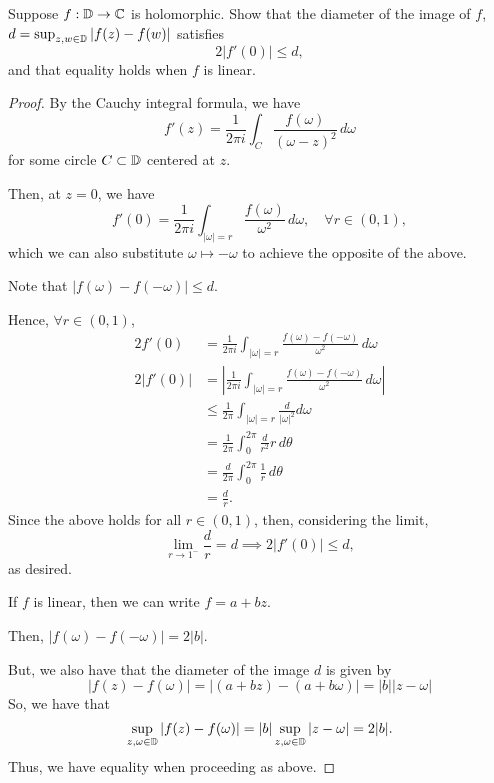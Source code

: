 \documentclass[../hw2]{subfiles}
\begin{document}
\begin{problem}
Suppose $f:\mathbb{D}\to \mathbb{C}$ is holomorphic.
Show that the diameter of the image of $f$,  $d=\sup_{z,w\in \mathbb{D}}|f(z)-f(w)|$ satisfies \[
	2|f'(0)|\le d
	,\] and that equality holds when $f$ is linear.
\end{problem}
\begin{proof}
By the Cauchy integral formula, we have \[
f'(z)=\frac{1}{2\pi i}\int_{C} \frac{f(\omega)}{(\omega-z)^2}\,d\omega
\] for some circle $C\subset \mathbb{D}$ centered at $z$.

Then, at $z=0$, we have  \[
f'(0)=\frac{1}{2\pi i}\int_{|\omega| = r} \frac{f(\omega)}{\omega^2}\,d\omega, \quad \forall r\in (0,1)
,\] which we can also substitute $\omega\mapsto -\omega$ to achieve the opposite of the above. 

Note that $|f(\omega)-f(-\omega)|\le d$.

Hence, $\forall r \in (0,1)$,
\begin{align*}
  2f'(0)&=\frac{1}{2\pi i}\int_{|\omega| = r} \frac{f(\omega)-f(-\omega)}{\omega^2} \,d\omega\\
  2|f'(0)|&=\left|  \frac{1}{2\pi i}\int_{|\omega| = r} \frac{f(\omega)-f(-\omega)}{\omega^2} \,d\omega\right| \\
          &\le \frac{1}{2\pi} \int_{|\omega| = r} \frac{d}{|\omega|^2} d\omega \\
          &= \frac{1}{2\pi} \int_{0}^{2\pi} \frac{d}{r^2} r\,d\theta\\
          &= \frac{d}{2\pi} \int_{0}^{2\pi} \frac{1}{r} \,d\theta\\
          &= \frac{d}{r}
.\end{align*}
Since the above holds for all $r \in (0,1)$, then, considering the limit, \[
\lim_{r \to 1^-} \frac{d}{r} = d \implies 2|f'(0)| \le d 
,\] as desired.

If $f$ is linear, then we can write  $f= a + bz$. 

Then,  $|f(\omega)-f(-\omega)| = 2|b|$. 

But, we also have that the diameter of the image $d$ is given by  \[
|f(z)-f(\omega)| = |(a+bz)-(a+b\omega)| = |b| |z-\omega|
\]  
So, we have that  \[
\sup_{z,\omega\in \mathbb{D}}|f(z)-f(\omega)| = |b| \sup_{z,\omega\in \mathbb{D}}|z-\omega| = 2|b|
.\] 
Thus, we have equality when proceeding as above.
\end{proof}
\end{document}
